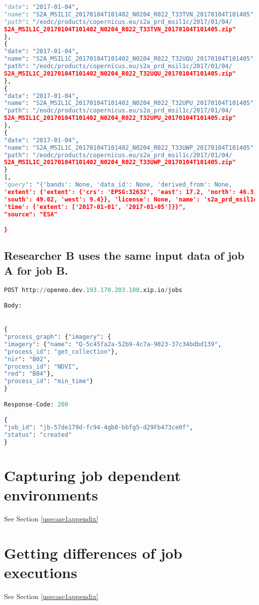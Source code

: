\documentclass[draft,final]{vutinfth} %
\begin{document}
\begin{lstlisting}[frame=single, language=Python]
"date": "2017-01-04",
"name": "S2A_MSIL1C_20170104T101402_N0204_R022_T33TVN_20170104T101405",
"path": "/eodc/products/copernicus.eu/s2a_prd_msil1c/2017/01/04/
S2A_MSIL1C_20170104T101402_N0204_R022_T33TVN_20170104T101405.zip"
},
{
"date": "2017-01-04",
"name": "S2A_MSIL1C_20170104T101402_N0204_R022_T32UQU_20170104T101405",
"path": "/eodc/products/copernicus.eu/s2a_prd_msil1c/2017/01/04/
S2A_MSIL1C_20170104T101402_N0204_R022_T32UQU_20170104T101405.zip"
},
{
"date": "2017-01-04",
"name": "S2A_MSIL1C_20170104T101402_N0204_R022_T32UPU_20170104T101405",
"path": "/eodc/products/copernicus.eu/s2a_prd_msil1c/2017/01/04/
S2A_MSIL1C_20170104T101402_N0204_R022_T32UPU_20170104T101405.zip"
},
{
"date": "2017-01-04",
"name": "S2A_MSIL1C_20170104T101402_N0204_R022_T33UWP_20170104T101405",
"path": "/eodc/products/copernicus.eu/s2a_prd_msil1c/2017/01/04/
S2A_MSIL1C_20170104T101402_N0204_R022_T33UWP_20170104T101405.zip"
}
],
"query": "{'bands': None, 'data_id': None, 'derived_from': None, 
'extent': {'extent': {'crs': 'EPSG:32632', 'east': 17.2, 'north': 46.3, 
'south': 49.02, 'west': 9.4}}, 'license': None, 'name': 's2a_prd_msil1c', 
'time': {'extent': ['2017-01-01', '2017-01-05']}}",
"source": "ESA"

}
\end{lstlisting}

\subsection{Researcher B uses the same input data of job A for job B.}
\begin{lstlisting}[frame=single, language=Python]
POST http://openeo.dev.193.170.203.100.xip.io/jobs

Body:


{ 
"process_graph": {"imagery": { 
"imagery": {"name": "Q-5c45fa2a-52b9-4c7a-9023-37c34bdbd139", 
"process_id": "get_collection"},
"nir": "B02",
"process_id": "NDVI",
"red": "B04"},
"process_id": "min_time"}
}

Response-Code: 200

{
"job_id": "jb-57de179d-fc94-4gb0-bbfg5-d29Fb473ce0f",
"status": "created"
}
\end{lstlisting}


\section{Capturing job dependent environments}
See Section \ref{usecase1appendix}

\section{Getting differences of job executions}
See Section \ref{usecase1appendix}
\end{document}

